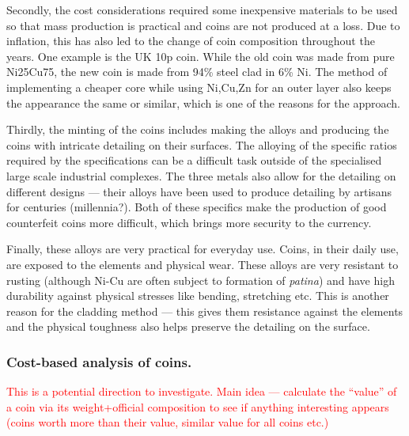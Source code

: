 \documentclass[11pt,a4paper,twoside,onecolumn]{article}
\newcommand{\reminder}[1]{\textcolor{red}{#1}}
\begin{document}
Secondly, the cost considerations required some inexpensive materials to be used so that mass production is practical and coins are not produced at a loss. Due to inflation, this has also led to the change of coin composition throughout the years. One example is the UK 10p coin. While the old coin was made from pure Ni25Cu75, the new coin is made from 94\% steel clad in 6\% Ni. The method of implementing a cheaper core while using Ni,Cu,Zn for an outer layer also keeps the appearance the same or similar, which is one of the reasons for the approach.

Thirdly, the minting of the coins includes making the alloys and producing the coins with intricate detailing on their surfaces. The alloying of the specific ratios required by the specifications can be a difficult task outside of the specialised large scale industrial complexes. The three metals also allow for the detailing on different designs --- their alloys have been used to produce detailing by artisans for centuries (millennia?). Both of these specifics make the production of good counterfeit coins more difficult, which brings more security to the currency.

Finally, these alloys are very practical for everyday use. Coins, in their daily use, are exposed to the elements and physical wear. These alloys are very resistant to rusting (although Ni-Cu are often subject to formation of \emph{patina}) and have high durability against physical stresses like bending, stretching etc. This is another reason for the cladding method --- this gives them resistance against the elements and the physical toughness also helps preserve the detailing on the surface.

\subsubsection{Cost-based analysis of coins.}
\reminder{This is a potential direction to investigate. Main idea --- calculate the ``value'' of a coin via its weight+official composition to see if anything interesting appears (coins worth more than their value, similar value for all coins etc.)}
\end{document}
